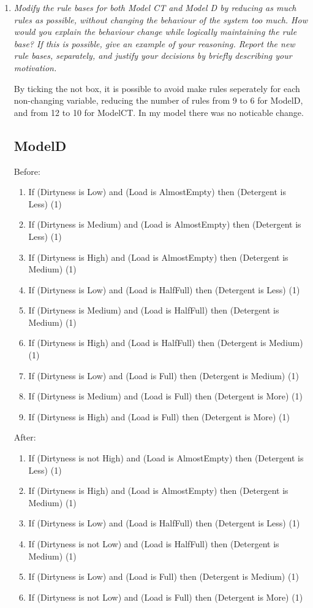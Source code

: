 \documentclass[11pt]{article}
\begin{document}
\begin{enumerate}[label=(\alph*)]
  \item \textit{Modify the rule bases for both Model CT and Model D by reducing
  as much rules as possible, without changing the behaviour of the system too
  much. How would you explain the behaviour change while logically maintaining
  the rule base? If this is possible, give an example of your reasoning. Report
  the new rule bases, separately, and justify your decisions by briefly
  describing your motivation.}

  By ticking the not box, it is possible to avoid make rules seperately for each
  non-changing variable, reducing the number of rules from 9 to 6 for ModelD,
  and from 12 to 10 for ModelCT. In my model there was no noticable change.

  \subsection*{ModelD}

  Before:
  \begin{enumerate}[label=(\arabic*)]
    \item If (Dirtyness is Low) and (Load is AlmostEmpty) then (Detergent is
    Less) (1)
    \item If (Dirtyness is Medium) and (Load is AlmostEmpty) then (Detergent is
    Less) (1)
    \item If (Dirtyness is High) and (Load is AlmostEmpty) then (Detergent is
    Medium) (1)
    \item If (Dirtyness is Low) and (Load is HalfFull) then (Detergent is Less)
    (1)
    \item If (Dirtyness is Medium) and (Load is HalfFull) then (Detergent is
    Medium) (1)
    \item If (Dirtyness is High) and (Load is HalfFull) then (Detergent is
    Medium) (1)
    \item If (Dirtyness is Low) and (Load is Full) then (Detergent is Medium)
    (1)
    \item If (Dirtyness is Medium) and (Load is Full) then (Detergent is More)
    (1)
    \item If (Dirtyness is High) and (Load is Full) then (Detergent is More) (1)
  \end{enumerate}

  After:
  \begin{enumerate}[label=(\arabic*)]
    \item If (Dirtyness is not High) and (Load is AlmostEmpty) then (Detergent
    is Less) (1)
    \item If (Dirtyness is High) and (Load is AlmostEmpty) then (Detergent is
    Medium) (1)
    \item If (Dirtyness is Low) and (Load is HalfFull) then (Detergent is Less)
    (1)
    \item If (Dirtyness is not Low) and (Load is HalfFull) then (Detergent
    is Medium) (1)
    \item If (Dirtyness is Low) and (Load is Full) then (Detergent is Medium)
    (1)
    \item If (Dirtyness is not Low) and (Load is Full) then (Detergent is More)
    (1)
  \end{enumerate}


\end{enumerate}
\end{document}
